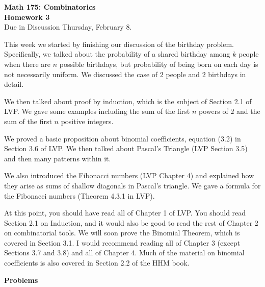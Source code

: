 \documentclass[11pt]{article}
\begin{document}
\begin{center}
{\Large \bf Math 175: Combinatorics} \\
{\Large \bf Homework 3}\\
{\Large Due in Discussion Thursday, February 8.}
\end{center}

\vspace{5mm}

This week we started by finishing our discussion of the birthday problem.  Specifically, we talked about the probability of a shared birthday among $k$ people when there are $n$ possible birthdays, but probability of being born on each day is not necessarily uniform.  We discussed the case of $2$ people and $2$ birthdays in detail.

We then talked about proof by induction, which is the subject of Section 2.1 of LVP.  We gave some examples including the sum of the first $n$ powers of $2$ and the sum of the first $n$ positive integers.  

We proved a basic proposition about binomial coefficients, equation (3.2) in Section 3.6 of LVP.  We then talked about Pascal's Triangle (LVP Section 3.5) and then many patterns within it.

We also introduced the Fibonacci numbers (LVP Chapter 4) and explained how they arise as sums of shallow diagonals in Pascal's triangle.  We gave a formula for the Fibonacci numbers (Theorem 4.3.1 in LVP).

At this point, you should have read all of Chapter 1 of LVP.  You should read Section 2.1 on Induction, and it would also be good to read the rest of Chapter 2 on combinatorial tools.  We will soon prove the Binomial Theorem, which is covered in Section 3.1.  I would recommend reading all of Chapter 3 (except Sections 3.7 and 3.8) and all of Chapter 4.  Much of the material on binomial coefficients is also covered in Section 2.2 of the HHM book.



\newpage


\centerline{ \bf \Large Problems}
\end{document}
